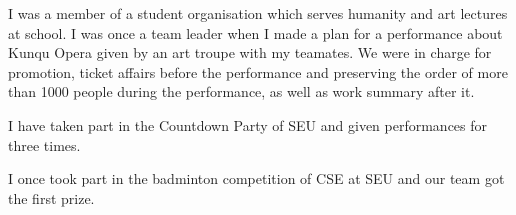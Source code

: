 \vspace{-6.0mm}

\begin{cventries}
\cvpapers
{
    \begin{cvitems}
    \item {I was a member of a student organisation which serves humanity and art lectures at school. I was once a team leader when I made a plan for a performance about Kunqu Opera given by an art troupe with my teamates. We were in charge for promotion, ticket affairs before the performance and preserving the order of more than 1000 people during the performance, as well as work summary after it.}
    \item {I have taken part in the Countdown Party of SEU and given performances for three times.}
    \item {I once took part in the badminton competition of CSE at SEU and our team got the first prize.}
    \end{cvitems}
}
\end{cventries}